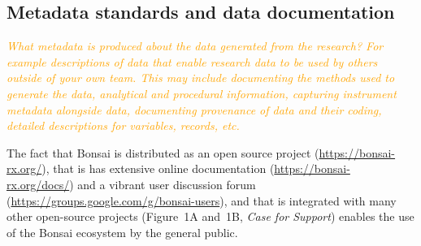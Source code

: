 \documentclass[a4paper,11pt]{article}
\begin{document}
\subsection{Metadata standards and data documentation}

\textcolor{orange}{\textit{What metadata is produced about the data generated from the research? For example descriptions of data that enable research data to be used by others outside of your own team.  This may include documenting the methods used to generate the data, analytical and procedural information, capturing instrument metadata alongside data, documenting provenance of data and their coding, detailed descriptions for variables, records, etc.}}

The fact that Bonsai is distributed as an open source project
(\url{https://bonsai-rx.org/}), that is has extensive online documentation
(\url{https://bonsai-rx.org/docs/}) and a vibrant user discussion forum
(\url{https://groups.google.com/g/bonsai-users}), and that is integrated with
many other open-source projects (Figure~1A and~1B, \emph{Case for Support})
enables the use of the Bonsai ecosystem by the general public.
\end{document}
